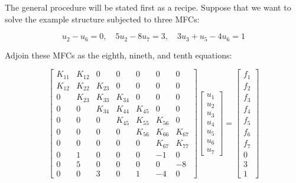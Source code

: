 The general procedure will be stated first as a recipe. Suppose that we want
to solve the example structure subjected to three MFCs:

\begin{equation}
    u_2 - u_6 = 0, \quad 5 u_2 - 8 u_7 = 3, \quad 3 u_3 + u_5 - 4 u_6 = 1
\end{equation}

Adjoin these MFCs as the eighth, nineth, and tenth equations:

\begin{equation}
    \begin{bmatrix}
        K_{11} & K_{12} & 0 & 0 & 0 & 0 & 0 \\
        K_{12} & K_{22} & K_{23} & 0 & 0 & 0 & 0 \\
        0 & K_{23} & K_{33} & K_{34} & 0 & 0 & 0 \\
        0 & 0 & K_{34} & K_{44} & K_{45} & 0 & 0 \\
        0 & 0 & 0 & K_{45} & K_{55} & K_{56} & 0 \\
        0 & 0 & 0 & 0 & K_{56} & K_{66} & K_{67} \\
        0 & 0 & 0 & 0 & 0 & K_{67} & K_{77} \\
        0 & 1 & 0 & 0 & 0 & -1 & 0 \\
        0 & 5 & 0 & 0 & 0 & 0 & -8 \\
        0 & 0 & 3 & 0 & 1 & -4 & 0
    \end{bmatrix}
    \begin{bmatrix}
        u_1 \\
        u_2 \\
        u_3 \\
        u_4 \\
        u_5 \\
        u_6 \\
        u_7
    \end{bmatrix}
    = \begin{bmatrix}
        f_1 \\
        f_2 \\
        f_3 \\
        f_4 \\
        f_5 \\
        f_6 \\
        f_7 \\
        0 \\
        3 \\
        1
    \end{bmatrix}
\end{equation}

